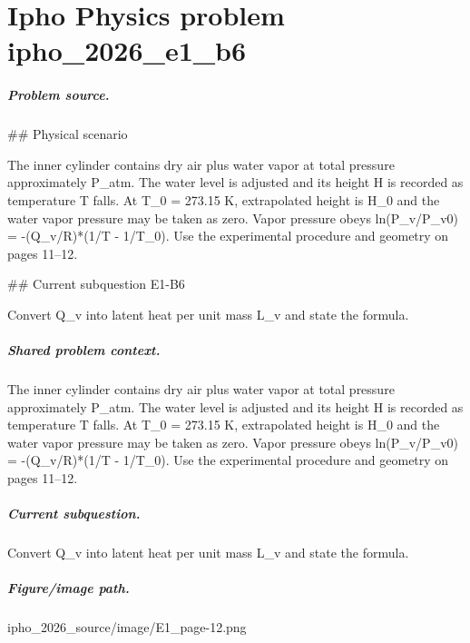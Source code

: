 
\chapter{Ipho Physics problem ipho\_2026\_e1\_b6}
\label{ch:IPhO2026Problems_problem_ipho_2026_e1_b6}

\paragraph{Problem source.}
\#\# Physical scenario

The inner cylinder contains dry air plus water vapor at total pressure
approximately P\_atm.  The water level is adjusted and its height H is recorded
as temperature T falls.  At T\_0 = 273.15 K, extrapolated height is H\_0 and the
water vapor pressure may be taken as zero.  Vapor pressure obeys
ln(P\_v/P\_v0) = -(Q\_v/R)*(1/T - 1/T\_0).  Use the experimental procedure and
geometry on pages 11--12.

\#\# Current subquestion E1-B6

Convert Q\_v into latent heat per unit mass L\_v and state the formula.

\paragraph{Shared problem context.}
The inner cylinder contains dry air plus water vapor at total pressure
approximately P\_atm.  The water level is adjusted and its height H is recorded
as temperature T falls.  At T\_0 = 273.15 K, extrapolated height is H\_0 and the
water vapor pressure may be taken as zero.  Vapor pressure obeys
ln(P\_v/P\_v0) = -(Q\_v/R)*(1/T - 1/T\_0).  Use the experimental procedure and
geometry on pages 11--12.

\paragraph{Current subquestion.}
Convert Q\_v into latent heat per unit mass L\_v and state the formula.

\paragraph{Figure/image path.}
ipho\_2026\_source/image/E1\_page-12.png

